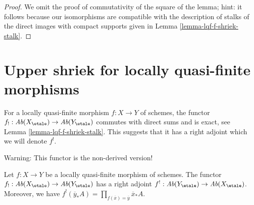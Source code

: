 \begin{proof}
\medskip\noindent
We omit the proof of commutativity of the square of the lemma; hint:
it follows because our isomorphisms are compatible with the description
of stalks of the direct images with compact supports given in
Lemma \ref{lemma-lqf-f-shriek-stalk}.
\end{proof}










\section{Upper shriek for locally quasi-finite morphisms}
\label{section-duality-locally-quasi-finite}

\noindent
For a locally quasi-finite morphism $f : X \to Y$ of schemes, the
functor $f_! : \textit{Ab}(X_\etale) \to \textit{Ab}(Y_\etale)$ commutes
with direct sums and is exact, see Lemma \ref{lemma-lqf-f-shriek-stalk}.
This suggests that it has a right adjoint which we will denote $f^!$.

\medskip\noindent
Warning: This functor is the non-derived version!

\begin{lemma}
\label{lemma-lqf-f-upper-shriek}
Let $f : X \to Y$ be a locally quasi-finite morphism of schemes. The functor
$f_! : \textit{Ab}(X_\etale) \to \textit{Ab}(Y_\etale)$
has a right adjoint
$f^! : \textit{Ab}(Y_\etale) \to \textit{Ab}(X_\etale)$.
Moreover, we have $f^!(\overline{y}_*A) =
\prod_{f(\overline{x}) = \overline{y}} \overline{x}_*A$.
\end{lemma}


